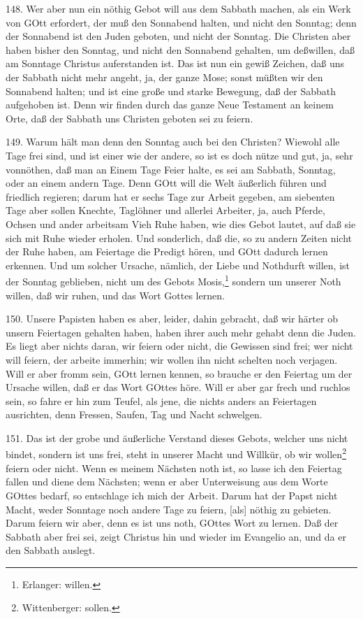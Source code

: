 148. Wer aber nun ein nöthig Gebot will aus dem Sabbath machen, als ein Werk von GOtt erfordert, der muß den Sonnabend halten, und nicht den Sonntag; denn der Sonnabend ist den Juden geboten, und nicht der Sonntag. Die Christen aber haben bisher den Sonntag, und nicht den Sonnabend gehalten, um deßwillen, daß am Sonntage Christus auferstanden ist. Das ist nun ein gewiß Zeichen, daß uns der Sabbath nicht mehr angeht, ja, der ganze Mose; sonst müßten wir den Sonnabend halten; und ist eine große und starke Bewegung, daß der Sabbath aufgehoben ist. Denn wir finden durch das ganze Neue Testament an keinem Orte, daß der Sabbath uns Christen geboten sei zu feiern.

149. Warum hält man denn den Sonntag auch bei den Christen? Wiewohl alle Tage frei sind, und ist einer wie der andere, so ist es doch nütze und gut, ja, sehr vonnöthen, daß man an Einem Tage Feier halte, es sei am Sabbath, Sonntag, oder an einem andern Tage. Denn GOtt will die Welt äußerlich führen und friedlich regieren; darum hat er sechs Tage zur Arbeit gegeben, am siebenten Tage aber sollen Knechte, Taglöhner und allerlei Arbeiter, ja, auch Pferde, Ochsen und ander arbeitsam Vieh Ruhe haben, wie dies Gebot lautet, auf daß sie sich mit Ruhe wieder erholen. Und sonderlich, daß die, so zu andern Zeiten nicht der Ruhe haben, am Feiertage die Predigt hören, und GOtt dadurch lernen erkennen. Und um solcher Ursache, nämlich, der Liebe und Nothdurft willen, ist der Sonntag geblieben, nicht um des Gebots Mosis,\footnote{Erlanger: willen.} sondern um unserer Noth willen, daß wir ruhen, und das Wort Gottes lernen.

150. Unsere Papisten haben es aber, leider, dahin gebracht, daß wir härter ob unsern Feiertagen gehalten haben, haben ihrer auch mehr gehabt denn die Juden. Es liegt aber nichts daran, wir feiern oder nicht, die Gewissen sind frei; wer nicht will feiern, der arbeite immerhin; wir wollen ihn nicht schelten noch verjagen. Will er aber fromm sein, GOtt lernen kennen, so brauche er den Feiertag um der Ursache willen, daß er das Wort GOttes höre. Will er aber gar frech und ruchlos sein, so fahre er hin zum Teufel, als jene, die nichts anders an Feiertagen ausrichten, denn Fressen, Saufen, Tag und Nacht schwelgen.

151. Das ist der grobe und äußerliche Verstand dieses Gebots, welcher uns nicht bindet, sondern ist uns frei, steht in unserer Macht und Willkür, ob wir wollen\footnote{Wittenberger: sollen.} feiern oder nicht. Wenn es meinem Nächsten noth ist, so lasse ich den Feiertag fallen und diene dem Nächsten; wenn er aber Unterweisung aus dem Worte GOttes bedarf, so entschlage ich mich der Arbeit. Darum hat der Papst nicht Macht, weder Sonntage noch
andere Tage zu feiern, [als] nöthig zu gebieten. Darum feiern wir aber, denn es ist uns noth, GOttes Wort zu lernen. Daß der Sabbath aber frei sei, zeigt Christus hin und wieder im Evangelio an, und da er den Sabbath auslegt.

